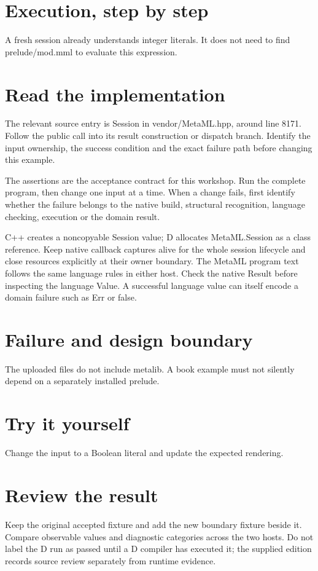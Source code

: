 
\section*{Execution, step by step}
A fresh session already understands integer literals. It does not need to find prelude/mod.mml to evaluate this expression.

\section*{Read the implementation}
The relevant source entry is Session in vendor/MetaML.hpp, around line 8171. Follow the public call into its result construction or dispatch branch. Identify the input ownership, the success condition and the exact failure path before changing this example.

The assertions are the acceptance contract for this workshop. Run the complete program, then change one input at a time. When a change fails, first identify whether the failure belongs to the native build, structural recognition, language checking, execution or the domain result.

\clearpage
{}
C++ creates a noncopyable Session value; D allocates MetaML.Session as a class reference. Keep native callback captures alive for the whole session lifecycle and close resources explicitly at their owner boundary. The MetaML program text follows the same language rules in either host. Check the native Result before inspecting the language Value. A successful language value can itself encode a domain failure such as Err or false.


\section*{Failure and design boundary}
The uploaded files do not include metalib. A book example must not silently depend on a separately installed prelude.

\section*{Try it yourself}
Change the input to a Boolean literal and update the expected rendering.

\section*{Review the result}
Keep the original accepted fixture and add the new boundary fixture beside it. Compare observable values and diagnostic categories across the two hosts. Do not label the D run as passed until a D compiler has executed it; the supplied edition records source review separately from runtime evidence.


